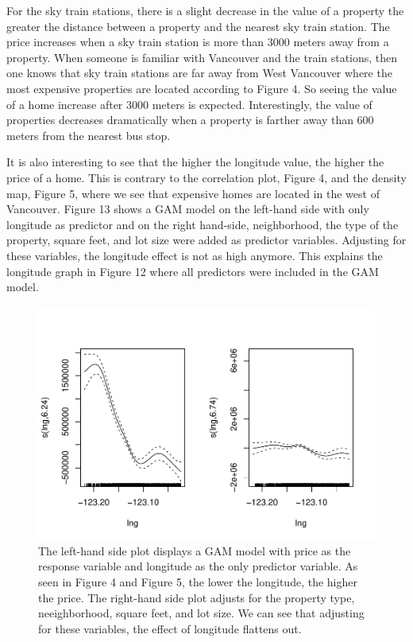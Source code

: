 \documentclass[
]{article}
\begin{document}
For the sky train stations, there is a slight decrease in the value of a
property the greater the distance between a property and the nearest sky
train station. The price increases when a sky train station is more than
3000 meters away from a property. When someone is familiar with
Vancouver and the train stations, then one knows that sky train stations
are far away from West Vancouver where the most expensive properties are
located according to Figure 4. So seeing the value of a home increase
after 3000 meters is expected. Interestingly, the value of properties
decreases dramatically when a property is farther away than 600 meters
from the nearest bus stop.

It is also interesting to see that the higher the longitude value, the
higher the price of a home. This is contrary to the correlation plot,
Figure 4, and the density map, Figure 5, where we see that expensive
homes are located in the west of Vancouver. Figure 13 shows a GAM model
on the left-hand side with only longitude as predictor and on the right
hand-side, neighborhood, the type of the property, square feet, and lot
size were added as predictor variables. Adjusting for these variables,
the longitude effect is not as high anymore. This explains the longitude
graph in Figure 12 where all predictors were included in the GAM model.

\begin{figure}
\centering
\includegraphics{final_report_files/figure-latex/unnamed-chunk-18-1.pdf}
\caption{The left-hand side plot displays a GAM model with price as the
response variable and longitude as the only predictor variable. As seen
in Figure 4 and Figure 5, the lower the longitude, the higher the price.
The right-hand side plot adjusts for the property type, neeighborhood,
square feet, and lot size. We can see that adjusting for these
variables, the effect of longitude flattens out.}
\end{figure}
\end{document}

